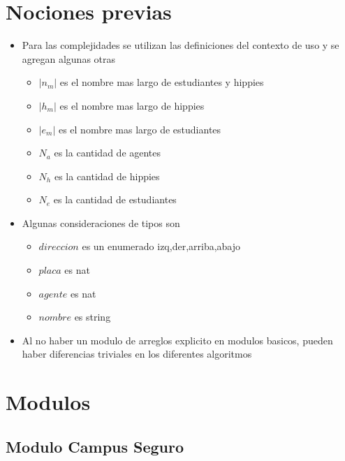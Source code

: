 \documentclass[a4paper,10pt, nofootinbib]{article}
\begin{document}
\thispagestyle{empty}

\maketitle

\tableofcontents
\newpage


\clearpage
\section{Nociones previas}
\begin{itemize}
\item Para las complejidades se utilizan las definiciones del contexto de uso y se agregan algunas otras
\begin{itemize}
	\item $|n_m|$ es el nombre mas largo de estudiantes y hippies
	\item $|h_m|$ es el nombre mas largo de hippies
	\item $|e_m|$ es el nombre mas largo de estudiantes
	\item $N_a$ es la cantidad de agentes
	\item $N_h$ es la cantidad de hippies
	\item $N_e$ es la cantidad de estudiantes
\end{itemize}
\item Algunas consideraciones de tipos son
\begin{itemize}
	\item $direccion$ es un enumerado {izq,der,arriba,abajo}
	\item $placa$ es nat
	\item $agente$ es nat
	\item $nombre$ es string
\end{itemize}
\item Al no haber un modulo de arreglos explicito en modulos basicos, pueden haber diferencias triviales en los diferentes algoritmos

\end{itemize}

\section{Modulos}
\subsection{Modulo Campus Seguro}

\newpage
\end{document}
